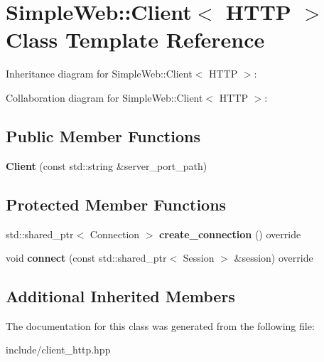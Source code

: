 \hypertarget{classSimpleWeb_1_1Client_3_01HTTP_01_4}{}\section{Simple\+Web\+:\+:Client$<$ H\+T\+TP $>$ Class Template Reference}
\label{classSimpleWeb_1_1Client_3_01HTTP_01_4}


Inheritance diagram for Simple\+Web\+:\+:Client$<$ H\+T\+TP $>$\+:


Collaboration diagram for Simple\+Web\+:\+:Client$<$ H\+T\+TP $>$\+:
\subsection*{Public Member Functions}
\begin{DoxyCompactItemize}
\item 
{\bfseries Client} (const std\+::string \&server\+\_\+port\+\_\+path)\hypertarget{classSimpleWeb_1_1Client_3_01HTTP_01_4_a47655afc849e459096743876391dae17}{}\label{classSimpleWeb_1_1Client_3_01HTTP_01_4_a47655afc849e459096743876391dae17}

\end{DoxyCompactItemize}
\subsection*{Protected Member Functions}
\begin{DoxyCompactItemize}
\item 
std\+::shared\+\_\+ptr$<$ Connection $>$ {\bfseries create\+\_\+connection} () override\hypertarget{classSimpleWeb_1_1Client_3_01HTTP_01_4_af959e410a4bb6fb02f6e6bcdefafe3f7}{}\label{classSimpleWeb_1_1Client_3_01HTTP_01_4_af959e410a4bb6fb02f6e6bcdefafe3f7}

\item 
void {\bfseries connect} (const std\+::shared\+\_\+ptr$<$ Session $>$ \&session) override\hypertarget{classSimpleWeb_1_1Client_3_01HTTP_01_4_aa2399b44ac60eb3deff65fb6ea2bf53a}{}\label{classSimpleWeb_1_1Client_3_01HTTP_01_4_aa2399b44ac60eb3deff65fb6ea2bf53a}

\end{DoxyCompactItemize}
\subsection*{Additional Inherited Members}


The documentation for this class was generated from the following file\+:\begin{DoxyCompactItemize}
\item 
include/client\+\_\+http.\+hpp\end{DoxyCompactItemize}
